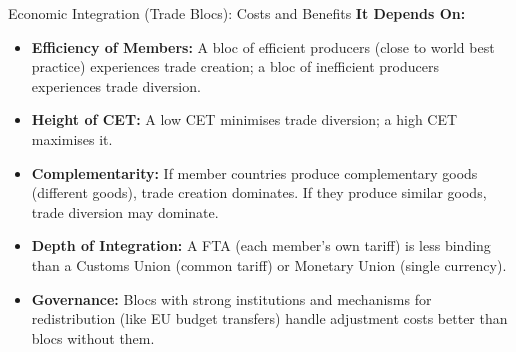 \documentclass[11pt, a4paper, twoside]{book}
\begin{document}
\begin{evaluation}{Economic Integration (Trade Blocs): Costs and Benefits}
\textbf{It Depends On:}
\begin{itemize}
  \item \textbf{Efficiency of Members:} A bloc of efficient producers (close to world best practice) experiences trade creation; a bloc of inefficient producers experiences trade diversion.
  \item \textbf{Height of CET:} A low CET minimises trade diversion; a high CET maximises it.
  \item \textbf{Complementarity:} If member countries produce complementary goods (different goods), trade creation dominates. If they produce similar goods, trade diversion may dominate.
  \item \textbf{Depth of Integration:} A FTA (each member's own tariff) is less binding than a Customs Union (common tariff) or Monetary Union (single currency).
  \item \textbf{Governance:} Blocs with strong institutions and mechanisms for redistribution (like EU budget transfers) handle adjustment costs better than blocs without them.
\end{itemize}
\end{evaluation}
\end{document}
